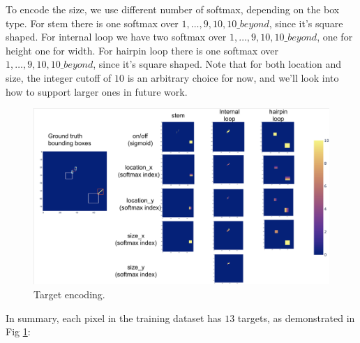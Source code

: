 \documentclass[12pt]{article}
\begin{document}
To encode the size, we use different number of softmax, depending on the box type.
For stem there is one softmax over $1, \dots, 9, 10, 10\_beyond$, since it's square shaped.
For internal loop we have two softmax over $1, \dots, 9, 10, 10\_beyond$, one for height one for width.
For hairpin loop there is one softmax over $1, \dots, 9, 10, 10\_beyond$, since it's square shaped.
Note that for both location and size, the integer cutoff of $10$ is an arbitrary choice for now,
and we'll look into how to support larger ones in future work.

\begin{figure}[h]
    \centering
    \includegraphics[width=\textwidth]{plot/training_pixel_targets.png}
    \caption{Target encoding.}
    \label{fig:training_pixel_targets}
    \centering
\end{figure}

In summary, each pixel in the training dataset has $13$ targets,
as demonstrated in Fig \ref{fig:training_pixel_targets}:
\end{document}
